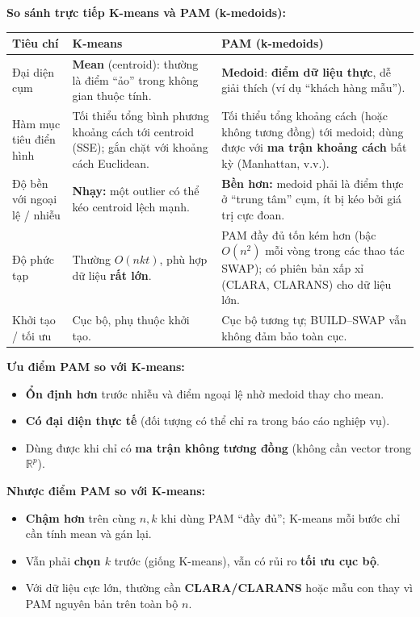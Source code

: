 \documentclass[10pt]{article}
\begin{document}
\textbf{So sánh trực tiếp K-means và PAM (k-medoids):}

\begin{center}
\small
\setlength{\tabcolsep}{6pt}
\renewcommand{\arraystretch}{1.35}
\begin{tabular}{|p{}|p{}|p{}|}
\hline
\textbf{Tiêu chí} & \textbf{K-means} & \textbf{PAM (k-medoids)} \\
\hline
Đại diện cụm & \textbf{Mean} (centroid): thường là điểm ``ảo'' trong không gian thuộc tính. & \textbf{Medoid}: \textbf{điểm dữ liệu thực}, dễ giải thích (ví dụ ``khách hàng mẫu''). \\
\hline
Hàm mục tiêu điển hình & Tối thiểu tổng bình phương khoảng cách tới centroid (SSE); gắn chặt với khoảng cách Euclidean. & Tối thiểu tổng khoảng cách (hoặc không tương đồng) tới medoid; dùng được với \textbf{ma trận khoảng cách} bất kỳ (Manhattan, v.v.). \\
\hline
Độ bền với ngoại lệ / nhiễu & \textbf{Nhạy:} một outlier có thể kéo centroid lệch mạnh. & \textbf{Bền hơn:} medoid phải là điểm thực ở ``trung tâm'' cụm, ít bị kéo bởi giá trị cực đoan. \\
\hline
Độ phức tạp & Thường $O(nkt)$, phù hợp dữ liệu \textbf{rất lớn}. & PAM đầy đủ tốn kém hơn (bậc $O(n^2)$ mỗi vòng trong các thao tác SWAP); có phiên bản xấp xỉ (CLARA, CLARANS) cho dữ liệu lớn. \\
\hline
Khởi tạo / tối ưu & Cục bộ, phụ thuộc khởi tạo. & Cục bộ tương tự; BUILD--SWAP vẫn không đảm bảo toàn cục. \\
\hline
\end{tabular}
\end{center}

\textbf{Ưu điểm PAM so với K-means:}
\begin{itemize}
    \item \textbf{Ổn định hơn} trước nhiễu và điểm ngoại lệ nhờ medoid thay cho mean.
    \item \textbf{Có đại diện thực tế} (đối tượng có thể chỉ ra trong báo cáo nghiệp vụ).
    \item Dùng được khi chỉ có \textbf{ma trận không tương đồng} (không cần vector trong $\mathbb{R}^p$).
\end{itemize}

\textbf{Nhược điểm PAM so với K-means:}
\begin{itemize}
    \item \textbf{Chậm hơn} trên cùng $n,k$ khi dùng PAM ``đầy đủ''; K-means mỗi bước chỉ cần tính mean và gán lại.
    \item Vẫn phải \textbf{chọn $k$} trước (giống K-means), vẫn có rủi ro \textbf{tối ưu cục bộ}.
    \item Với dữ liệu cực lớn, thường cần \textbf{CLARA/CLARANS} hoặc mẫu con thay vì PAM nguyên bản trên toàn bộ $n$.
\end{itemize}
\end{document}
